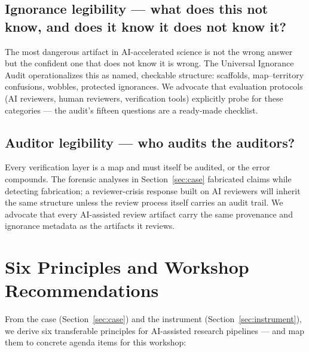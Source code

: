 \documentclass{article}
\begin{document}
\subsection{Ignorance legibility --- what does this not know, and does it know it does not know it?}
The most dangerous artifact in AI-accelerated science is not the wrong answer but the confident one that does not know it is wrong. The Universal Ignorance Audit operationalizes this as named, checkable structure: scaffolds, map--territory confusions, wobbles, protected ignorances. We advocate that evaluation protocols (AI reviewers, human reviewers, verification tools) explicitly probe for these categories --- the audit's fifteen questions are a ready-made checklist.

\subsection{Auditor legibility --- who audits the auditors?}
Every verification layer is a map and must itself be audited, or the error compounds. The forensic analyses in Section~\ref{sec:case} fabricated claims while detecting fabrication; a reviewer-crisis response built on AI reviewers will inherit the same structure unless the review process itself carries an audit trail. We advocate that every AI-assisted review artifact carry the same provenance and ignorance metadata as the artifacts it reviews.

\section{Six Principles and Workshop Recommendations}
\label{sec:principles}

From the case (Section~\ref{sec:case}) and the instrument (Section~\ref{sec:instrument}), we derive six transferable principles for AI-assisted research pipelines --- and map them to concrete agenda items for this workshop:
\end{document}
